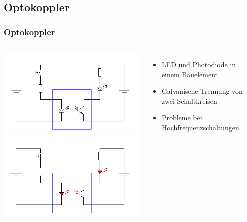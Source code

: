 \subsection*{Optokoppler}
\begin{frame}
  \frametitle{Optokoppler}
  \begin{columns}[c]
    \begin{center}
      \includegraphics[width=1\textwidth,height=.4\textheight,keepaspectratio]{a05/Optokoppler_Aus.png}\\
      \includegraphics[width=1\textwidth,height=.4\textheight,keepaspectratio]{a05/Optokoppler_An.png}
      \tiny \hyperlink{refs}{\cite{wm}}
    \end{center}
    \begin{itemize}
      \item LED und Photodiode in einem Bauelement
      \item Galvanische Trennung von zwei Schaltkreisen
      \item Probleme bei Hochfrequenzschaltungen
    \end{itemize}
  \end{columns}
\end{frame}

